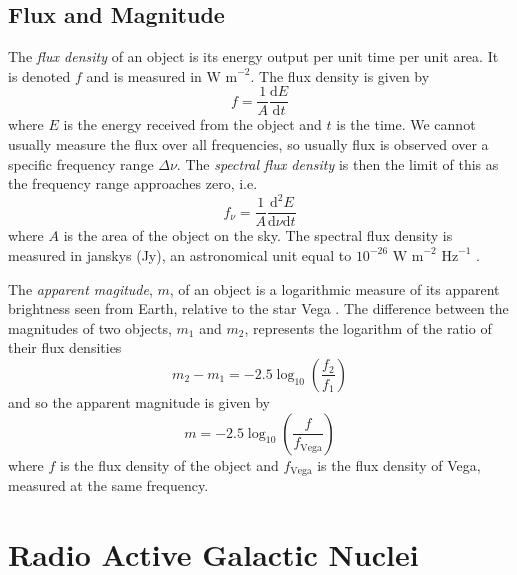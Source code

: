         \subsection{Flux and Magnitude}

            The \emph{flux density} of an object is its energy output per unit
            time per unit area. It is denoted $f$ and is measured in $\text{W
            m}^{-2}$. The flux density is given by
            \[
                f = \frac{1}{A}\frac{\text{d}E}{\text{d}t}
            \]
            where $E$ is the energy received from the object and $t$ is the
            time. We cannot usually measure the flux over all frequencies, so
            usually flux is observed over a specific frequency range $\Delta
            \nu$. The \emph{spectral flux density} is then the limit of this as
            the frequency range approaches zero, i.e.
            \[
                f_\nu = \frac{1}{A}\frac{\text{d}^2E}{\text{d}\nu\text{d}t}
            \]
            where $A$ is the area of the object on the sky. The spectral flux
            density is measured in janskys (Jy), an astronomical unit equal to
            $10^{-26} \text{ W m}^{-2} \text{ Hz}^{-1}$ \citep{francis08}.

            The \emph{apparent magitude}, $m$, of an object is a logarithmic
            measure of its apparent brightness seen from Earth, relative to the
            star Vega \citep{francis08}. The difference between the magnitudes
            of two objects, $m_1$ and $m_2$, represents the logarithm of the
            ratio of their flux densities
            \begin{equation}
                \label{eq:magnitude-difference}
                m_2 - m_1 = -2.5 \log_{10} \left(\frac{f_2}{f_1}\right)
            \end{equation}
            and so the apparent magnitude is given by
            \begin{equation}
                \label{eq:apparent-magnitude}
                m = -2.5 \log_{10} \left(\frac{f}{f_{\text{Vega}}}\right)
            \end{equation}
            where $f$ is the flux density of the object and $f_{\text{Vega}}$ is
            the flux density of Vega, measured at the same frequency.

    \section{Radio Active Galactic Nuclei}
    \label{sec:agns}

